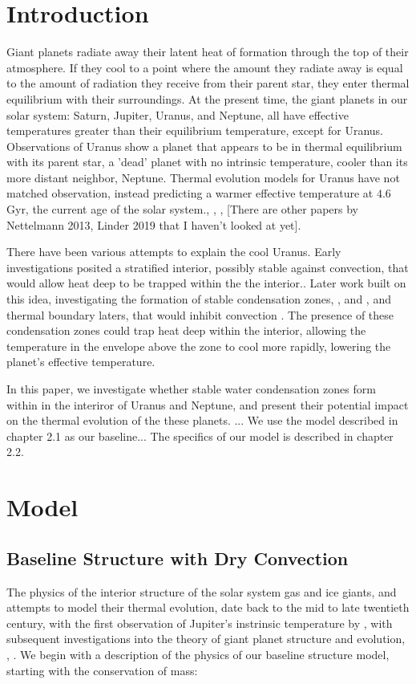 \documentclass[11pt]{ucscthesisbs}
\begin{document}
\chapter{Introduction}
Giant planets radiate away their latent heat of formation through the top of their atmosphere. If they cool to a point where the amount they radiate away is equal to the amount of radiation they receive from their parent star, they enter thermal equilibrium with their surroundings. At the present time, the giant planets in our solar system: Saturn, Jupiter, Uranus, and Neptune, all have effective temperatures greater than their equilibrium temperature, except for Uranus. Observations of Uranus show a planet that appears to be in thermal equilibrium with its parent star, a 'dead' planet with no intrinsic temperature, cooler than its more distant neighbor, Neptune. Thermal evolution models for Uranus have not matched observation, instead predicting a warmer effective temperature at $4.6$ Gyr, the current age of the solar system.\citep{fortney_2011}, \citep{podolak_1991}, \citep{hubbard_1995}, \citep{scheibe_2019} [There are other papers by Nettelmann 2013, Linder 2019 that I haven't looked at yet]. 

There have been various attempts to explain the cool Uranus. Early investigations posited a stratified interior, possibly stable against convection, that would allow heat deep to be trapped within the the interior.\citep{podolak_1991}. Later work built on this idea, investigating the formation of stable condensation zones\citep{friedson_2017}, \citep{leconte_2017}, and \citep{guillot_1995}, and thermal boundary laters\citep{nettelmann_2016}, that would inhibit convection . The presence of these condensation zones could trap heat deep within the interior, allowing the temperature in the envelope above the zone to cool more rapidly, lowering the planet's effective temperature.

In this paper, we investigate whether stable water condensation zones form within in the interiror of Uranus and Neptune, and present their potential impact on the thermal evolution of the these planets.
...
We use the model described in chapter 2.1 as our baseline...
The specifics of our model is described in chapter 2.2.

\chapter{Model}

\section{Baseline Structure with Dry Convection}
The physics of the interior structure of the solar system gas and ice giants, and attempts to model their thermal evolution, date back to the mid to late twentieth century, with the first observation of Jupiter's instrinsic temperature by \cite{low_1966}, with subsequent investigations into the theory of giant planet structure and evolution\citep{hubbard_1977}, \citep{hubbard_1977_2}, \citep{podolak_1991}. We begin with a description of the physics of our baseline structure model, starting with the conservation of mass:
\end{document}
